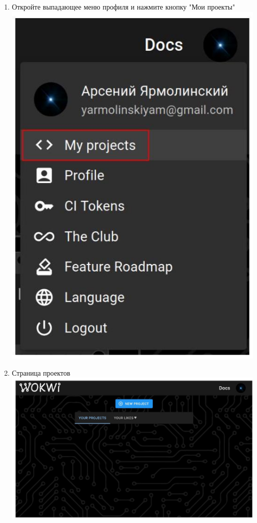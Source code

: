 \begin{enumerate}
    \item Откройте выпадающее меню профиля и нажмите кнопку "Мои проекты"\\
    \includegraphics[max width=\maxwidth, max height=\maxheight, center]{2}
    
    \clearpage\item Страница проектов\\
    \includegraphics[max width=\maxwidth, max height=\maxheight, center]{3}
    

\end{enumerate}
